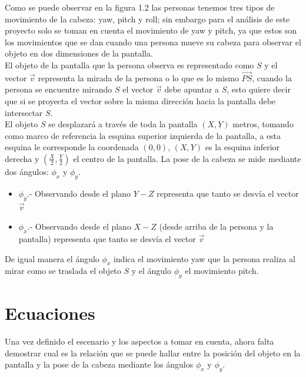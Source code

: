 \documentclass[paper=a4, fontsize=11pt]{scrartcl} %
\numberwithin{equation}{section} %
\numberwithin{figure}{section} %
\numberwithin{table}{section} %
\begin{document}
Como se puede observar en la figura 1.2 las personas tenemos tres tipos de movimiento de la cabeza: yaw, pitch y roll; sin embargo para el análisis de este proyecto solo se toman en cuenta el movimiento de yaw y pitch, ya que estos son los movimientos que se dan cuando una persona mueve su cabeza para observar el objeto en dos dimensiones de la pantalla.\\
El objeto de la pantalla que la persona observa es representado como $S$ y el vector $\vec v$ representa la mirada de la persona o lo que es lo mismo $\vec{PS}$, cuando la persona se encuentre mirando $S$ el vector $\vec v$  debe apuntar a $S$, esto quiere decir que si se proyecta el vector sobre la misma dirección hacia la pantalla debe intersectar $S$.\\
El objeto $S$ se desplazará a través de toda la pantalla $(X,Y)$ metros, tomando como marco de referencia la esquina superior izquierda de la pantalla, a esta esquina le corresponde la coordenada $(0,0)$, $(X,Y)$ es la esquina inferior derecha y $(\frac{X}{2}, \frac{Y}{2})$ el centro de la pantalla.
La pose de la cabeza se mide mediante dos ángulos: $\phi_x$ y $\phi_y$.
\begin{itemize}
  \item $\phi_y$.- Observando desde el plano $Y-Z$ representa que tanto se desvía el vector $\vec v$%
  \item $\phi_x$.- Observando desde el plano $X-Z$ (desde arriba de la persona y la pantalla) representa que tanto se desvía el vector $\vec v$ %
\end{itemize}
De igual manera el ángulo $\phi_x$ indica el movimiento yaw que la persona realiza al mirar como se traslada el objeto $S$ y el ángulo $\phi_y$ el movimiento pitch.

\section{Ecuaciones}
Una vez definido el escenario y los aspectos a tomar en cuenta, ahora falta demostrar cual es la relación que se puede hallar entre la posición del objeto en la pantalla y la pose de la cabeza mediante los ángulos $\phi_x$ y $\phi_y$.
\end{document}
